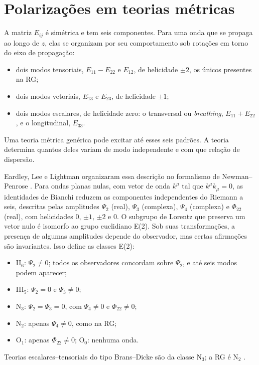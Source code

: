 \section{Polarizações em teorias métricas}

A matriz $E_{ij}$ é simétrica e tem seis componentes. Para uma onda que
se propaga ao longo de $z$, elas se organizam por seu comportamento sob
rotações em torno do eixo de propagação:
\begin{itemize}
 \item dois modos tensoriais, $E_{11}-E_{22}$ e $E_{12}$, de helicidade
 $\pm2$, os únicos presentes na RG;
 \item dois modos vetoriais, $E_{13}$ e $E_{23}$, de helicidade $\pm1$;
 \item dois modos escalares, de helicidade zero: o transversal ou
 \emph{breathing}, $E_{11}+E_{22}$, e o longitudinal, $E_{33}$.
\end{itemize}
Uma teoria métrica genérica pode excitar até esses seis padrões. A
teoria determina quantos deles variam de modo independente e com que
relação de dispersão.

Eardley, Lee e Lightman organizaram essa descrição no formalismo de
Newman--Penrose \autocite{eardley1973}. Para ondas planas nulas, com
vetor de onda $k^\mu$ tal que $k^\mu k_\mu=0$, as identidades de Bianchi
reduzem as componentes independentes do Riemann a seis, descritas pelas
amplitudes $\Psi_2$ (real), $\Psi_3$ (complexa), $\Psi_4$ (complexa) e
$\Phi_{22}$ (real), com helicidades $0$, $\pm1$, $\pm2$ e $0$. O
subgrupo de Lorentz que preserva um vetor nulo é isomorfo ao grupo
euclidiano E(2). Sob suas transformações, a presença de algumas
amplitudes depende do observador, mas certas afirmações são invariantes.
Isso define as classes E(2):
\begin{itemize}
 \item II$_6$: $\Psi_2\neq0$; todos os observadores concordam sobre
 $\Psi_2$, e até seis modos podem aparecer;
 \item III$_5$: $\Psi_2=0$ e $\Psi_3\neq0$;
 \item N$_3$: $\Psi_2=\Psi_3=0$, com $\Psi_4\neq0$ e $\Phi_{22}\neq0$;
 \item N$_2$: apenas $\Psi_4\neq0$, como na RG;
 \item O$_1$: apenas $\Phi_{22}\neq0$; O$_0$: nenhuma onda.
\end{itemize}
Teorias escalares--tensoriais do tipo Brans--Dicke são da classe
N$_3$; a RG é N$_2$ \autocite{will2014}.

